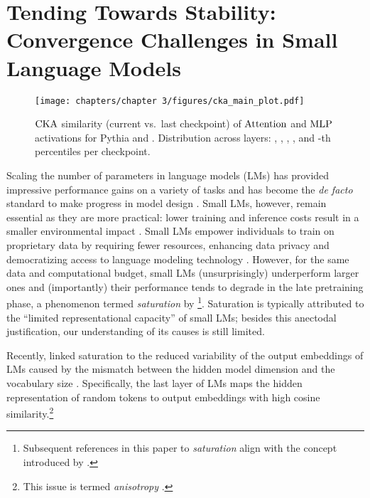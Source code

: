 \chapter{Tending Towards Stability: Convergence Challenges in Small Language Models}


\begin{figure}[!t]
    \centering
    \texttt{[image: chapters/chapter 3/figures/cka\_main\_plot.pdf]}
    \caption{$\mathrm{CKA}$ similarity (current vs.\ last checkpoint) of $\mathrm{Attention}$ and $\mathrm{MLP}$ activations for Pythia \sixmil and \twobil. Distribution across layers: , , , , and -th percentiles per checkpoint.}
    \label{fig:cka_main_plot}
\end{figure}


Scaling the number of parameters in language models (LMs) has provided impressive performance gains on a variety of tasks \citep{hendrycks2021mmlu} and has become the \emph{de facto} standard to make progress in model design \citep[e.g.,][]{chowdhery2023palm}.
Small LMs, however, remain essential as they are more practical: lower training and inference costs result in a smaller environmental impact \citep{schwartz2020greenai}. 
Small LMs empower individuals to train on proprietary data by requiring fewer resources, enhancing data privacy \citep{huang2022large} and democratizing access to language modeling technology \citep{bender2021dangers}.
However, for the same data and computational budget, small LMs (unsurprisingly) underperform larger ones \citep{biderman2023pythia} and (importantly) their performance tends to degrade in the late pretraining phase, a phenomenon termed \textit{saturation} by \citet{godey2024small} \footnote{Subsequent references in this paper to \textit{saturation} align with the concept introduced by \citet{godey2024small}.}. Saturation is typically attributed to the \enquote{limited representational capacity} of small LMs; besides this anectodal justification, our understanding of its causes is still limited. 

Recently, \citet{godey2024small} linked saturation to the reduced variability of the output embeddings of LMs caused by the mismatch between the hidden model dimension and the vocabulary size \citep{yang2018breaking}. Specifically, the last layer of LMs maps the hidden representation of random tokens to output embeddings with high cosine similarity.\footnote{This issue is termed \emph{anisotropy} \citep{ethayarajh2019contextual}.}


